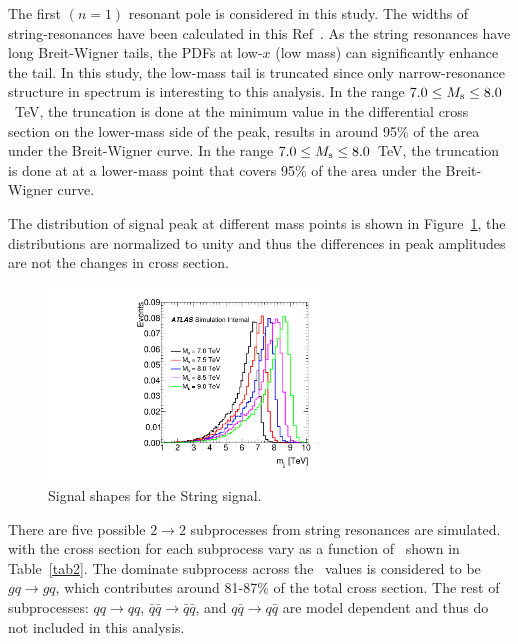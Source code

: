 The first $(n=1)$ resonant pole is considered in this study. The widths of string-resonances have been calculated in this Ref~\cite{Anchordoqui:2008hi}. As the string resonances have long Breit-Wigner tails, the PDFs at low-$x$ (low mass) can significantly enhance the tail. In this study, the low-mass tail is truncated since only narrow-resonance structure in \mjj spectrum is interesting to this analysis. In the range $7.0 \leq M_\mathrm{s} \leq 8.0$~TeV, the truncation is done at the minimum value in the differential cross section on the lower-mass side of the \Ms peak, results in around 95\% of the area under the Breit-Wigner curve. In the range $7.0 \leq M_\mathrm{s} \leq 8.0$~TeV, the truncation is done at at a lower-mass point that covers 95\% of the area under the Breit-Wigner curve.

The distribution of signal peak at different mass points is shown in Figure~\ref{fig:shape_strings}, the distributions are normalized to unity and thus the differences in peak amplitudes are not the changes in cross section.

\begin{figure}[htb]
\centering
\includegraphics[width=0.65\textwidth]{fig/benchmark_signals/SignalShape-strings.pdf}
\caption{Signal shapes for the String signal.}
\label{fig:shape_strings}
\end{figure}


There are five possible $2\to 2$ subprocesses from string resonances are simulated. with the cross section for each subprocess vary as a function of \Ms\ shown in Table~\ref{tab2}. The dominate subprocess across the \Ms\ values is considered to be $gq\to gq$, which contributes around 81-87\% of the total cross section. The rest of subprocesses: $qq\to qq$, $\bar{q}\bar{q}\to \bar{q}\bar{q}$, and $q\bar{q}\to
q\bar{q}$ are model dependent and thus do not included in this analysis. 


